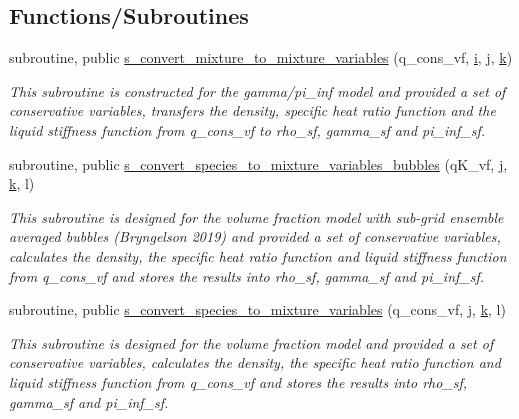 \subsection*{Functions/\+Subroutines}
\begin{DoxyCompactItemize}
\item 
subroutine, public \hyperlink{namespacem__variables__conversion_a272a4452dad903bf877b475d322b921a}{s\+\_\+convert\+\_\+mixture\+\_\+to\+\_\+mixture\+\_\+variables} (q\+\_\+cons\+\_\+vf, \hyperlink{m__data__output_8f90_aaea4baed8fd8b780f6938f0dc1fb0f72}{i}, \hyperlink{m__data__output_8f90_aeadbc0ce9b66517f8fde156199772ec1}{j}, \hyperlink{m__data__output_8f90_af22c486581933c52df7d4aa306382074}{k})
\begin{DoxyCompactList}\small\item\em This subroutine is constructed for the gamma/pi\+\_\+inf model and provided a set of conservative variables, transfers the density, specific heat ratio function and the liquid stiffness function from q\+\_\+cons\+\_\+vf to rho\+\_\+sf, gamma\+\_\+sf and pi\+\_\+inf\+\_\+sf. \end{DoxyCompactList}\item 
subroutine, public \hyperlink{namespacem__variables__conversion_acf8095b9ff1a0e61e857cd39cc4b87cc}{s\+\_\+convert\+\_\+species\+\_\+to\+\_\+mixture\+\_\+variables\+\_\+bubbles} (q\+K\+\_\+vf, \hyperlink{m__data__output_8f90_aeadbc0ce9b66517f8fde156199772ec1}{j}, \hyperlink{m__data__output_8f90_af22c486581933c52df7d4aa306382074}{k}, l)
\begin{DoxyCompactList}\small\item\em This subroutine is designed for the volume fraction model with sub-\/grid ensemble averaged bubbles (Bryngelson 2019) and provided a set of conservative variables, calculates the density, the specific heat ratio function and liquid stiffness function from q\+\_\+cons\+\_\+vf and stores the results into rho\+\_\+sf, gamma\+\_\+sf and pi\+\_\+inf\+\_\+sf. \end{DoxyCompactList}\item 
subroutine, public \hyperlink{namespacem__variables__conversion_ae1178f49330fb2bccdc60a6076432626}{s\+\_\+convert\+\_\+species\+\_\+to\+\_\+mixture\+\_\+variables} (q\+\_\+cons\+\_\+vf, \hyperlink{m__data__output_8f90_aeadbc0ce9b66517f8fde156199772ec1}{j}, \hyperlink{m__data__output_8f90_af22c486581933c52df7d4aa306382074}{k}, l)
\begin{DoxyCompactList}\small\item\em This subroutine is designed for the volume fraction model and provided a set of conservative variables, calculates the density, the specific heat ratio function and liquid stiffness function from q\+\_\+cons\+\_\+vf and stores the results into rho\+\_\+sf, gamma\+\_\+sf and pi\+\_\+inf\+\_\+sf. \end{DoxyCompactList}\item 

\end{DoxyCompactItemize}

